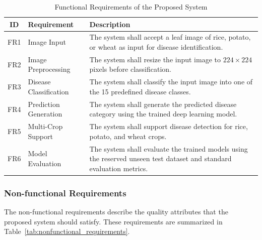 \begin{table}[H]
\centering

\label{tab:functional_requirements}
\begin{tabular}{|c|p{4cm}|p{8cm}|}
\hline
\textbf{ID} & \textbf{Requirement} & \textbf{Description} \\ \hline
FR1 & Image Input & The system shall accept a leaf image of rice, potato, or wheat as input for disease identification. \\ \hline
FR2 & Image Preprocessing & The system shall resize the input image to $224 \times 224$ pixels before classification. \\ \hline
FR3 & Disease Classification & The system shall classify the input image into one of the 15 predefined disease classes. \\ \hline
FR4 & Prediction Generation & The system shall generate the predicted disease category using the trained deep learning model. \\ \hline
FR5 & Multi-Crop Support & The system shall support disease detection for rice, potato, and wheat crops. \\ \hline
FR6 & Model Evaluation & The system shall evaluate the trained models using the reserved unseen test dataset and standard evaluation metrics. \\ \hline
\end{tabular}
\caption{Functional Requirements of the Proposed System}
\end{table}

\subsubsection{Non-functional Requirements}

The non-functional requirements describe the quality attributes that the proposed system should satisfy. These requirements are summarized in Table~\ref{tab:nonfunctional_requirements}.

